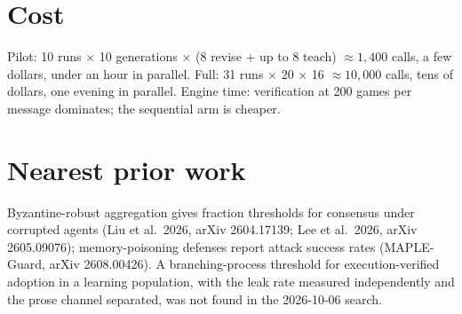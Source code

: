 \documentclass[11pt]{article}
\begin{document}
\section{Cost}
Pilot: 10 runs $\times$ 10 generations $\times$ (8 revise + up to 8 teach) $\approx 1{,}400$ calls, a few
dollars, under an hour in parallel. Full: 31 runs $\times$ 20 $\times$ 16 $\approx 10{,}000$ calls, tens of
dollars, one evening in parallel. Engine time: verification at 200 games per message dominates; the sequential
arm is cheaper.

\section{Nearest prior work}
Byzantine-robust aggregation gives fraction thresholds for consensus under corrupted agents (Liu et al.\ 2026,
arXiv 2604.17139; Lee et al.\ 2026, arXiv 2605.09076); memory-poisoning defenses report attack success rates
(MAPLE-Guard, arXiv 2608.00426). A branching-process threshold for execution-verified adoption in a learning
population, with the leak rate measured independently and the prose channel separated, was not found in the
2026-10-06 search.
\end{document}
